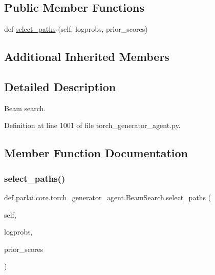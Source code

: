 \subsection*{Public Member Functions}
\begin{DoxyCompactItemize}
\item 
def \hyperlink{classparlai_1_1core_1_1torch__generator__agent_1_1BeamSearch_a3d67c12c987514ad263418ca2d98bbba}{select\+\_\+paths} (self, logprobs, prior\+\_\+scores)
\end{DoxyCompactItemize}
\subsection*{Additional Inherited Members}


\subsection{Detailed Description}
\begin{DoxyVerb}Beam search.\end{DoxyVerb}
 

Definition at line 1001 of file torch\+\_\+generator\+\_\+agent.\+py.



\subsection{Member Function Documentation}
\mbox{\label{classparlai_1_1core_1_1torch__generator__agent_1_1BeamSearch_a3d67c12c987514ad263418ca2d98bbba}} 
\subsubsection{\texorpdfstring{select\+\_\+paths()}{select\_paths()}}
{\footnotesize\ttfamily def parlai.\+core.\+torch\+\_\+generator\+\_\+agent.\+Beam\+Search.\+select\+\_\+paths (\begin{DoxyParamCaption}\item[{}]{self,  }\item[{}]{logprobs,  }\item[{}]{prior\+\_\+scores }\end{DoxyParamCaption})}

